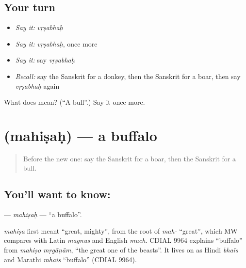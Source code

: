 \subsection*{Your turn}
\begin{itemize}
\raggedright
  \item \emph{Say it:} \emph{vṛṣabhaḥ}
  \item \emph{Say it:} \emph{vṛṣabhaḥ}, once more
  \item \emph{Say it:} say \emph{vṛṣabhaḥ}
  \item \emph{Recall:} say the Sanskrit for a donkey, then the Sanskrit for a boar, then say \emph{vṛṣabhaḥ} again
\end{itemize}

\begin{tcolorbox}[breakable,colback=teal!4,colframe=teal!35!black,title={Before you move on}]
What does  mean? (\textquotedblleft{}A bull\textquotedblright{}.) Say it once more.
\end{tcolorbox}
\section[\texorpdfstring{\sk{महिषः} (mahiṣaḥ)}{महिषः (mahiṣaḥ)}]{ (mahiṣaḥ) — a buffalo}

\label{lesson:SA-C113-mahisah}



\begin{quote}
Before the new one: say the Sanskrit for a boar, then the Sanskrit for a bull.
\end{quote}

\subsection*{You'll want to know: }
\textbf{} — \emph{mahiṣaḥ} — \textquotedblleft{}a buffalo\textquotedblright{}.

\begin{cousinweb}
\emph{mahiṣa} first meant \textquotedblleft{}great, mighty\textquotedblright{}, from the root of \emph{mah-} \textquotedblleft{}great\textquotedblright{}, which MW compares with Latin \emph{magnus} and English \emph{much}. CDIAL 9964 explains \textquotedblleft{}buffalo\textquotedblright{} from \emph{mahiṣo mṛgāṇām}, \textquotedblleft{}the great one of the beasts\textquotedblright{}. It lives on as Hindi \emph{bhaĩs} and Marathi \emph{mhais} \textquotedblleft{}buffalo\textquotedblright{} (CDIAL 9964).
\end{cousinweb}

